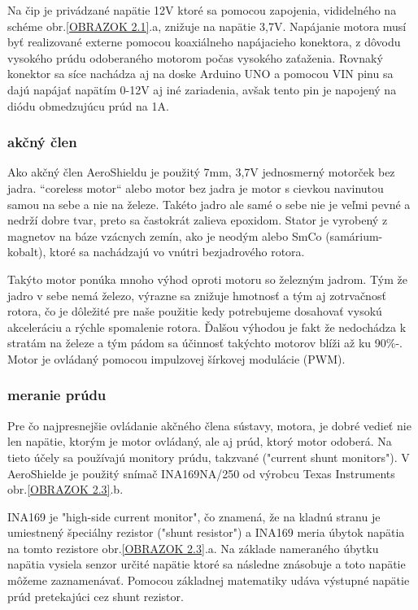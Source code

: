  Na čip je privádzané napätie 12V ktoré sa pomocou zapojenia, vididelného na schéme obr.\ref{OBRAZOK 2.1}.a, znižuje na napätie 3,7V. Napájanie motora musí byť realizované externe pomocou koaxiálneho napájacieho konektora, z dôvodu vysokého prúdu odoberaného motorom počas vysokého zaťaženia. Rovnaký konektor sa síce nachádza aj na doske Arduino UNO a pomocou VIN pinu sa dajú napájať napätím 0-12V aj iné zariadenia, avšak tento pin je napojený na diódu obmedzujúcu prúd na 1A\cite{ampere}\cite{ampere2}.



\subsubsection{akčný člen}
\label{akcclen}

Ako akčný člen AeroShieldu je použitý 7mm, 3,7V jednosmerný motorček bez jadra. “coreless motor“ alebo motor bez jadra je motor s cievkou navinutou samou na sebe a nie na železe\cite{coreless}. Takéto jadro ale samé o sebe nie je veľmi pevné a nedrží dobre tvar, preto sa častokrát zalieva epoxidom. Stator je vyrobený z magnetov na báze vzácnych zemín, ako je neodým alebo SmCo (samárium-kobalt), ktoré sa nachádzajú vo vnútri bezjadrového rotora.

Takýto motor ponúka mnoho výhod oproti motoru so železným jadrom. Tým že jadro v sebe nemá železo, výrazne sa znižuje hmotnosť a tým aj zotrvačnosť rotora, čo je dôležité pre naše použitie kedy potrebujeme dosahovať vysokú akceleráciu a rýchle spomalenie rotora. Ďalšou výhodou je fakt že nedochádza k stratám na železe a tým pádom sa účinnosť takýchto motorov blíži až ku 90\%-\cite{5545147}. Motor je ovládaný pomocou impulzovej šírkovej modulácie (PWM).



\subsubsection{meranie prúdu}
\label{merprud}

Pre čo najpresnejšie ovládanie akčného člena sústavy, motora, je dobré vedieť nie len napätie, ktorým je motor ovládaný, ale aj prúd, ktorý motor odoberá. Na tieto účely sa používajú monitory prúdu, takzvané ("current shunt monitors"). V AeroShielde je použitý snímač INA169NA/250 od výrobcu Texas Instruments obr.\ref{OBRAZOK 2.3}.b.

INA169 je "high-side current monitor", čo znamená, že na kladnú stranu je umiestnený špeciálny rezistor ("shunt resistor") a INA169 meria úbytok napätia na tomto rezistore obr.\ref{OBRAZOK 2.3}.a. Na základe nameraného úbytku napätia vysiela senzor určité napätie ktoré sa následne znásobuje a toto napätie môžeme zaznamenávať. Pomocou základnej matematiky udáva výstupné napätie prúd pretekajúci cez shunt rezistor\cite{INA}.


